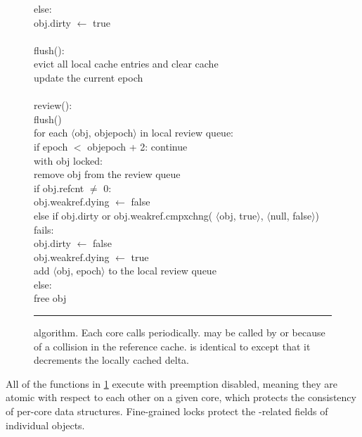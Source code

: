 \begin{figure}
\begin{tabbing}
          else: \+\\
            obj.dirty $\gets$ true \\
    \-\-\-\-\\[\fgap]
    flush(): \+\\
      evict all local cache entries and clear cache \\
      update the current epoch \\
    \-\\[\fgap]
    review(): \+\\
      flush() \\
      for each $\langle$obj, objepoch$\rangle$ in local review queue: \+\\
        if epoch $<$ objepoch + 2: continue \\
        with obj locked: \+\\
          remove obj from the review queue \\
          if obj.refcnt $\ne$ 0: \+\\
            obj.weakref.dying $\gets$ false \-\\
          else if obj.dirty or obj.weakref.cmpxchng(%
                $\langle$obj, true$\rangle$,
                $\langle$null, false$\rangle$) fails: \+\\
            obj.dirty $\gets$ false \\
            obj.weakref.dying $\gets$ true \\
            add $\langle$obj, epoch$\rangle$ to the local review queue \-\\
          else: \+\\
            free obj
  \end{tabbing}
  \vspace{-1em}                 %
  \rule{\columnwidth}{0.5pt}
  \vspace{-\baselineskip}
  \caption[ algorithm.]
  { algorithm.  Each core calls 
    periodically.   may be called by  or because of a
    collision in the reference cache.   is identical to  except
    that it decrements the locally cached delta.}
  \label{fig:refcache-code}
\end{figure}

All of the functions in \cref{fig:refcache-code} execute with
preemption disabled, meaning they are atomic with respect to each
other on a given core, which protects the consistency of per-core data
structures.  Fine-grained locks protect the -related fields
of individual objects.

